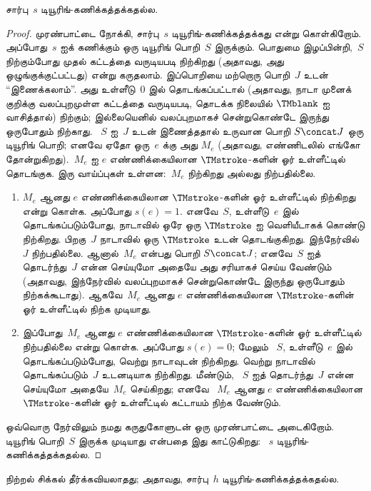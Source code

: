\documentclass[../../../include/open-logic-section]{subfiles}
\begin{document}
\begin{lem}
சார்பு~$s$ டியூரிங்-கணிக்கத்தக்கதல்ல.
\end{lem}

\begin{proof}
முரண்பாட்டை நோக்கி, சார்பு~$s$ டியூரிங்-கணிக்கத்தக்கது என்று கொள்கிறோம்.
அப்போது~$s$ ஐக் கணிக்கும் ஒரு டியூரிங் பொறி~$S$ இருக்கும். பொதுமை
இழப்பின்றி,~$S$ நிற்கும்போது முதல் கட்டத்தை வருடியபடி நிற்கிறது
(அதாவது, அது ஒழுங்குக்குட்பட்டது) என்று கருதலாம். இப்பொறியை மற்றொரு
பொறி~$J$ உடன் ``இணைக்கலாம்''. அது உள்ளீடு~$0$ இல்
தொடங்கப்பட்டால் (அதாவது, நாடா முனைக் குறிக்கு வலப்புறமுள்ள கட்டத்தை
வருடியபடி, தொடக்க நிலையில் $\TMblank$ ஐ வாசித்தால்) நிற்கும்;
இல்லையெனில் வலப்புறமாகச் சென்றுகொண்டே இருந்து ஒருபோதும் நிற்காது.
~$S$ ஐ~$J$ உடன் இணைத்ததால் உருவான பொறி $S \concat J$ ஒரு டியூரிங்
பொறி; எனவே ஏதோ ஒரு~$e$ க்கு அது $M_e$ (அதாவது, எண்ணிடலில் எங்கோ
தோன்றுகிறது).~$M_e$ ஐ $e$ எண்ணிக்கையிலான $\TMstroke$-களின் ஓர்
உள்ளீட்டில் தொடங்குக. இரு வாய்ப்புகள் உள்ளன:~$M_e$ நிற்கிறது அல்லது
நிற்பதில்லை.
\begin{enumerate}
\item $M_e$ ஆனது $e$ எண்ணிக்கையிலான $\TMstroke$-களின் ஓர் உள்ளீட்டில்
  நிற்கிறது என்று கொள்க. அப்போது $s(e) = 1$. எனவே~$S$, உள்ளீடு~$e$
  இல் தொடங்கப்படும்போது, நாடாவில் ஒரே ஒரு $\TMstroke$ ஐ வெளியீடாகக்
  கொண்டு நிற்கிறது. பிறகு~$J$ நாடாவில் ஒரு $\TMstroke$ உடன் தொடங்குகிறது.
  இந்நேர்வில்~$J$ நிற்பதில்லை. ஆனால்~$M_e$ என்பது பொறி $S
  \concat J$; எனவே~$S$ ஐத் தொடர்ந்து~$J$ என்ன செய்யுமோ அதையே அது
  சரியாகச் செய்ய வேண்டும் (அதாவது, இந்நேர்வில் வலப்புறமாகச்
  சென்றுகொண்டே இருந்து ஒருபோதும் நிற்கக்கூடாது). ஆகவே~$M_e$ ஆனது
  $e$ எண்ணிக்கையிலான $\TMstroke$-களின் ஓர் உள்ளீட்டில் நிற்க முடியாது.

\item இப்போது~$M_e$ ஆனது $e$ எண்ணிக்கையிலான $\TMstroke$-களின் ஓர்
  உள்ளீட்டில் நிற்பதில்லை என்று கொள்க. அப்போது $s(e) = 0$; மேலும்
  ~$S$, உள்ளீடு~$e$ இல் தொடங்கப்படும்போது, வெற்று நாடாவுடன் நிற்கிறது.
  வெற்று நாடாவில் தொடங்கப்படும்~$J$ உடனடியாக நிற்கிறது. மீண்டும்,
  ~$S$ ஐத் தொடர்ந்து~$J$ என்ன செய்யுமோ அதையே~$M_e$ செய்கிறது; எனவே
  ~$M_e$ ஆனது $e$ எண்ணிக்கையிலான $\TMstroke$-களின் ஓர் உள்ளீட்டில்
  கட்டாயம் நிற்க வேண்டும்.
\end{enumerate}
ஒவ்வொரு நேர்விலும் நமது கருதுகோளுடன் ஒரு முரண்பாட்டை அடைகிறோம்.
டியூரிங் பொறி~$S$ இருக்க முடியாது என்பதை இது காட்டுகிறது:
~$s$ டியூரிங்-கணிக்கத்தக்கதல்ல.
\end{proof}

\begin{thm}[நிற்றல் சிக்கலின் தீர்க்கவியலாமை]
 நிற்றல் சிக்கல் தீர்க்கவியலாதது; அதாவது,
சார்பு~$h$ டியூரிங்-கணிக்கத்தக்கதல்ல.
\end{thm}
\end{document}
